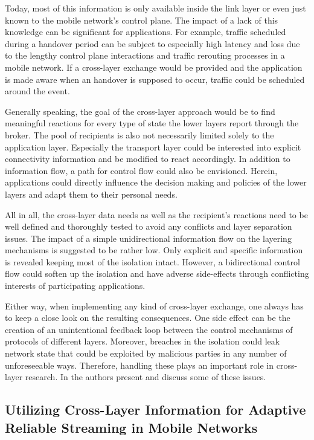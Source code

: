 Today, most of this information is only available inside the link layer or even just known to the mobile network's control plane. The impact of a lack of this knowledge can be significant for applications. For example, traffic scheduled during a handover period can be subject to especially high latency and loss due to the lengthy control plane interactions and traffic rerouting processes in a mobile network. If a cross-layer exchange would be provided and the application is made aware when an handover is supposed to occur, traffic could be scheduled around the event. 

Generally speaking, the goal of the cross-layer approach would be to find meaningful reactions for every type of state the lower layers report through the broker. The pool of recipients is also not necessarily limited solely to the application layer. Especially the transport layer could be interested into explicit connectivity information and be modified to react accordingly. In addition to information flow, a path for control flow could also be envisioned. Herein, applications could directly influence the decision making and policies of the lower layers and adapt them to their personal needs.

All in all, the cross-layer data needs as well as the recipient's reactions need to be well defined and thoroughly tested to avoid any conflicts and layer separation issues. The impact of a simple unidirectional information flow on the layering mechanisms is suggested to be rather low. Only explicit and specific information is revealed keeping most of the isolation intact. However, a bidirectional control flow could soften up the isolation and have adverse side-effects through conflicting interests of participating applications.

Either way, when implementing any kind of cross-layer exchange, one always has to keep a close look on the resulting consequences. One side effect can be the creation of an unintentional feedback loop between the control mechanisms of protocols of different layers. Moreover, breaches in the isolation could leak network state that could be exploited by malicious parties in any number of unforeseeable ways. Therefore, handling these plays an important role in cross-layer research. In \cite{1404568} the authors present and discuss some of these issues.


\subsection{Utilizing Cross-Layer Information for Adaptive Reliable Streaming in Mobile Networks}

